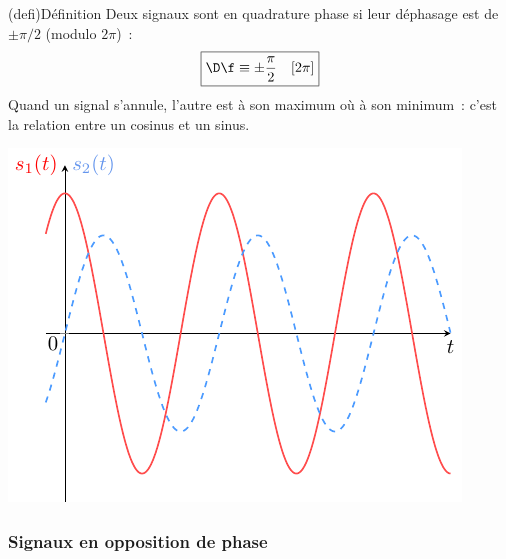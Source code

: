\documentclass[../../main/main.tex]{subfiles}
\begin{document}
\begin{minipage}{0.70\linewidth}
	\begin{tcb}(defi){\small Définition}
		Deux signaux sont en quadrature phase si leur déphasage est de
		$\pm\pi/2$ (modulo $2\pi$)~:
		\[\boxed{\D\f \equiv \pm\frac{\pi}{2} \quad[2\pi]}\]
		Quand un signal s'annule, l'autre est à son maximum où à son minimum~:
		c'est la relation entre un cosinus et un sinus.
	\end{tcb}
\end{minipage}
\hfill
\begin{minipage}{0.30\linewidth}
	\begin{center}
		\includegraphics[width=\linewidth]{dfeqpi2.pdf}
	\end{center}
\end{minipage}

\newpage
\subsubsection{Signaux en opposition de phase}
\end{document}

